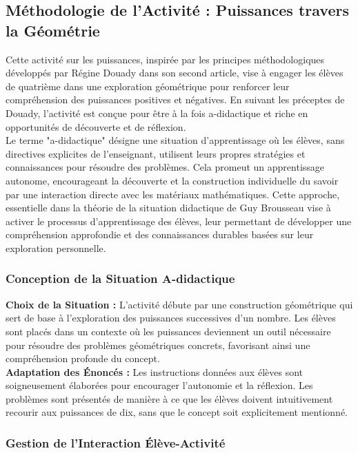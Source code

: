 \subsection{Méthodologie de l'Activité : Puissances travers la Géométrie}

Cette activité sur les puissances,
inspirée par les principes méthodologiques développés par Régine Douady dans son second article,
vise à engager les élèves de quatrième dans une exploration géométrique pour renforcer leur compréhension des puissances positives et négatives.
En suivant les préceptes de Douady,
l'activité est conçue pour être à la fois a-didactique et riche en opportunités de découverte et de réflexion.\\

Le terme "a-didactique" désigne une situation d'apprentissage où les élèves,
sans directives explicites de l'enseignant,
utilisent leurs propres stratégies et connaissances pour résoudre des problèmes.
Cela promeut un apprentissage autonome,
encourageant la découverte et la construction individuelle du savoir par une interaction directe avec les matériaux mathématiques.
Cette approche,
essentielle dans la théorie de la situation didactique de Guy Brousseau \cite{brousseau}
vise à activer le processus d'apprentissage des élèves,
leur permettant de développer une compréhension approfondie et des connaissances durables basées sur leur exploration personnelle.

\subsubsection{Conception de la Situation A-didactique}

\textbf{Choix de la Situation :}
L'activité débute par une construction géométrique qui sert de base à l'exploration des puissances successives d'un nombre.
Les élèves sont placés dans un contexte où les puissances deviennent un outil nécessaire pour résoudre des problèmes géométriques concrets,
favorisant ainsi une compréhension profonde du concept.\\

\textbf{Adaptation des Énoncés :}
Les instructions données aux élèves sont soigneusement élaborées pour encourager l'autonomie et la réflexion.
Les problèmes sont présentés de manière à ce que les élèves doivent intuitivement recourir aux puissances de dix,
sans que le concept soit explicitement mentionné.

\subsubsection{Gestion de l'Interaction Élève-Activité}

